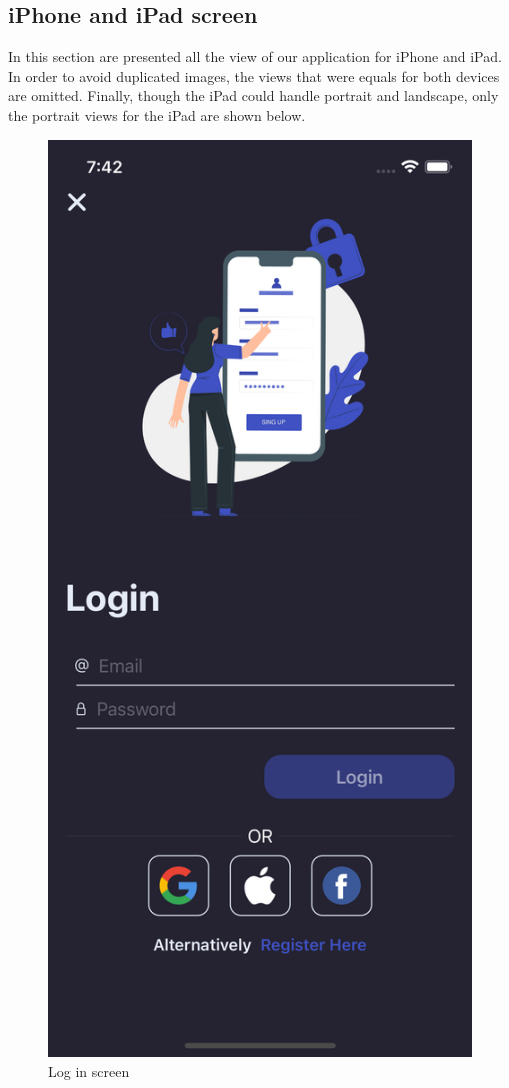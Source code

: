 \newpage
\subsection{iPhone and iPad screen}
In this section are presented all the view of our application for iPhone and iPad. In order to avoid duplicated images, the views that were equals for both devices are omitted. Finally, though the iPad could handle portrait and landscape, only the portrait views for the iPad are shown below.

\begin{figure}[h!]
        \centering
        \includegraphics[scale=0.15]{images/interfaces/login_screen.png}
         \caption{Log in screen}
        \label{fig:login_screen}
\end{figure}
